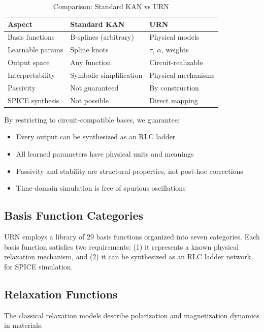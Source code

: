 \documentclass{ieeeaccess}
\begin{document}
\begin{table}[!t]
\caption{Comparison: Standard KAN vs URN}
\label{tab:kan_comparison}
\centering
\begin{tabular}{@{}lll@{}}
\toprule
\textbf{Aspect} & \textbf{Standard KAN} & \textbf{URN} \\
\midrule
Basis functions & B-splines (arbitrary) & Physical models \\
Learnable params & Spline knots & $\tau$, $\alpha$, weights \\
Output space & Any function & Circuit-realizable \\
Interpretability & Symbolic simplification & Physical mechanisms \\
Passivity & Not guaranteed & By construction \\
SPICE synthesis & Not possible & Direct mapping \\
\bottomrule
\end{tabular}
\end{table}

By restricting to circuit-compatible bases, we guarantee:
\begin{itemize}
\item Every output can be synthesized as an RLC ladder
\item All learned parameters have physical units and meanings
\item Passivity and stability are structural properties, not post-hoc corrections
\item Time-domain simulation is free of spurious oscillations
\end{itemize}

\subsection{Basis Function Categories}

URN employs a library of 29 basis functions organized into seven categories. Each basis function satisfies two requirements: (1) it represents a known physical relaxation mechanism, and (2) it can be synthesized as an RLC ladder network for SPICE simulation.

\subsection{Relaxation Functions}

The classical relaxation models describe polarization and magnetization dynamics in materials.
\end{document}
